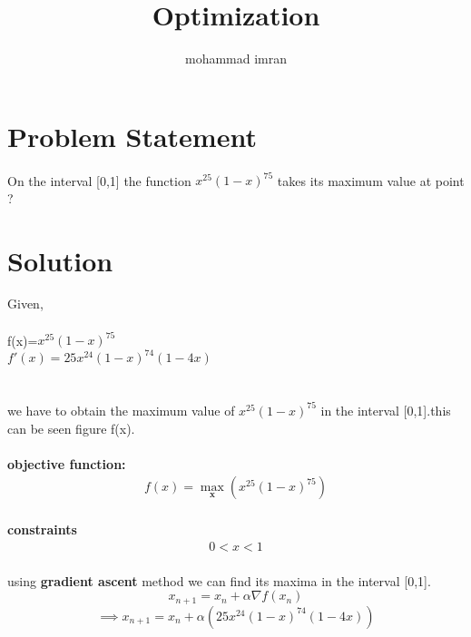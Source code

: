 \documentclass[journal,12pt,twocolumn]{article}
\let\vec\mathbf
\begin{document}
\title
{Optimization}
\author{mohammad imran}

\maketitle
\tableofcontents
\bigskip
\section{Problem Statement}
On the interval [0,1] the function $x^{25}(1-x)^{75}$ takes its maximum value at point ?\\


\section{Solution}
Given, \\
\\f(x)=$x^{25}(1-x)^{75}$\\

$f'(x)=25x^{24}(1-x)^{74}(1-4x)$\\
\\
\\we have to obtain the maximum value of $x^{25}(1-x)^{75}$ in the interval [0,1].this can be seen figure f(x).\\
\vspace{0.3cm}\\
\textbf{objective function:}
\begin{align}
f(x)= \max_\vec{x}(x^{25}(1-x)^{75})\\
\end{align}

\textbf{constraints}
\begin{align}
0<x<1
\end{align}
\\using \textbf{gradient ascent} method we can find its maxima in the interval [0,1].
\vspace{0.5cm}
\begin{equation}
 x_{n+1} = x_n + \alpha \nabla f(x_n)
\end{equation}
\vspace{0.2cm}
\begin{equation}
\implies x_{n+1}=x_n+\alpha(25x^{24}(1-x)^{74}(1-4x))
\end{equation}
\vspace{0.5cm}
\end{document}
